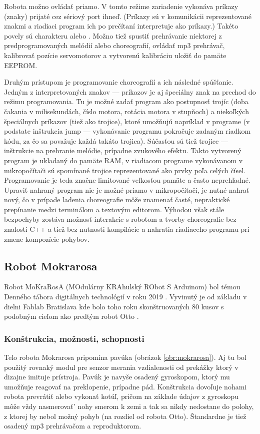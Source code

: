 Robota možno ovládať priamo. V tomto režime zariadenie vykonáva príkazy (znaky) prijaté cez sériový port ihneď. (Príkazy sú v komunikácii reprezentované znakmi a riadiaci program ich po prečítaní interpretuje ako príkazy.) Takéto povely sú charakteru  alebo . Možno tiež spustiť prehrávanie niektorej z predprogramovaných melódií alebo choreografií, ovládať mp3 prehrávač, kalibrovať pozície servomotorov a vytvorenú kalibráciu uložiť do pamäte EEPROM.

Druhým prístupom je programovanie choreografií a ich následné spúšťanie. Jedným z interpretovaných znakov --- príkazov je aj špeciálny znak na prechod do režimu programovania. Tu je možné zadať program ako postupnosť trojíc (doba čakania v milisekundách, číslo motora, rotácia motora v stupňoch) a niekoľkých špeciálnych príkazov (tiež ako trojice), ktoré umožňujú napríklad  v programe (v podstate inštrukcia jump --- vykonávanie programu pokračuje zadaným riadkom kódu, za čo sa považuje každá takáto trojica). Súčasťou sú tiež trojice --- inštrukcie na prehranie melódie, prípadne zvukového efektu. Takto vytvorený program je ukladaný do pamäte RAM, v riadiacom programe vykonávanom v mikropočítači sú spomínané trojice reprezentované ako prvky poľa celých čísel. Programovanie je teda značne limitované veľkosťou pamäte a často neprehľadné. Upraviť nahraný program nie je možné priamo v mikropočítači, je nutné nahrať nový, čo v prípade ladenia choreografie môže znamenať časté, nepraktické prepínanie medzi terminálom a textovým editorom. Výhodou však stále bezpochyby zostáva možnosť interakcie s robotom a tvorby choreografie bez znalosti C++ a tiež bez nutnosti kompilácie a nahratia riadiaceho programu pri zmene kompozície pohybov.

\newpage

\subsection{Robot Mokrarosa}
Robot MoKraRosA (MOdulárny KRAhulský RObot S Arduinom) bol témou Denného tábora digitálnych technológií v roku 2019 \cite{PetrovicVaskoMokrarosa}. Vyvinutý je od základu v dielni Fablab Bratislava kde bolo toho roku skonštruovaných 80 kusov s podobným cieľom ako predtým robot Otto \cite{Mokrarosa}.

\subsubsection{Konštrukcia, možnosti, schopnosti}
Telo robota Mokrarosa pripomína pavúka (obrázok \ref{obr:mokrarosa}). Aj tu bol použitý rovnaký modul pre senzor merania vzdialenosti od prekážky ktorý v dizajne imituje  prístroja. Pavúk je navyše osadený gyroskopom, ktorý mu umožňuje reagovať na preklopenie, prípadne pád. Konštrukcia dovoľuje nohami robota prevrátiť alebo vykonať kotúľ, pričom na základe údajov z gyroskopu môže vždy nasmerovať' nohy smerom k zemi a tak sa nikdy nedostane do polohy, z ktorej by nebol možný pohyb (na rozdiel od robota Otto). Štandardne je tiež osadený mp3 prehrávačom a reproduktorom.

